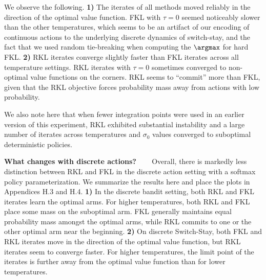 \documentclass[twoside,11pt]{article}
\newcommand{\myparagraph}[1]{\textbf{#1} \ \ \ }
\begin{document}



We observe the following.
\textbf{1)} The iterates of all methods moved reliably in the direction of the optimal value function. FKL with $\tau = 0$ seemed noticeably slower than the other temperatures, which seems to be an artifact of our encoding of continuous actions to the underlying discrete dynamics of switch-stay, and the fact that we used random tie-breaking when computing the $\argmax$ for hard FKL. 
\textbf{2)} RKL iterates converge slightly faster than FKL iterates across all temperature settings. RKL iterates with $\tau = 0$ sometimes converged to non-optimal value functions on the corners. RKL seems to ``commit'' more than FKL, given that the RKL objective forces probability mass away from actions with low probability. 

We also note here that when fewer integration points were used in an earlier version of this experiment, RKL exhibited substantial instability and a large number of iterates across temperatures and $\sigma_0$ values converged to suboptimal deterministic policies. 

 
\myparagraph{What changes with discrete actions?}
Overall, there is markedly less distinction between RKL and FKL in the discrete action setting with a softmax policy parameterization. We summarize the results here and place the plots in Appendices H.3 and H.4.
\textbf{1)} In the discrete bandit setting, both RKL and FKL iterates learn the optimal arms. For higher temperatures, both RKL and FKL place some mass on the suboptimal arm. FKL generally maintains equal probability mass amongst the optimal arms, while RKL commits to one or the other optimal arm near the beginning. 
\textbf{2)} On discrete Switch-Stay, both FKL and RKL iterates move in the direction of the optimal value function, but RKL iterates seem to converge faster. For higher temperatures, the limit point of the iterates is further away from the optimal value function than for lower temperatures. 
\end{document}
